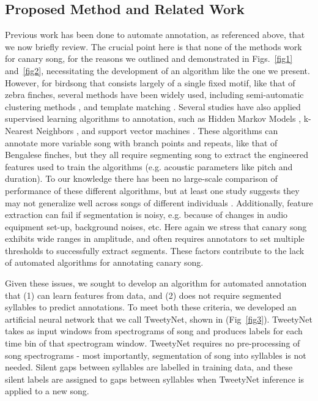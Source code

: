 \documentclass[10pt,letterpaper]{article}
\begin{document}
\subsection*{Proposed Method and Related Work}
\label{Related work}
Previous work has been done to automate annotation, as referenced above, 
that we now briefly review.
The crucial point here is that none of the methods work for canary song, for the 
reasons we outlined and demonstrated in Figs.~\ref{fig1} and~\ref{fig2}, necessitating the 
development of an algorithm like the one we present.
However, for birdsong that consists largely of a single fixed motif, like that of zebra finches,
several methods have been widely used, including semi-automatic clustering methods 
\cite{burkett2015voice,daou2012computational},
and template matching \cite{anderson1996template,yamahachi_undirected_2020,pearre_fast_2017}. 
Several studies have also applied supervised learning algorithms
to annotation, such as Hidden Markov Models \cite{kogan1998automated},
k-Nearest Neighbors \cite{songbrowser}, 
and support vector machines \cite{tachibana2014semi}.
These algorithms can annotate more variable song with branch points and repeats, 
like that of Bengalese finches, 
but they all require segmenting song to extract the engineered features 
used to train the algorithms (e.g. acoustic parameters like pitch and duration).
To our knowledge there has been no large-scale comparison 
of performance of these different algorithms, 
but at least one study suggests they may not generalize well across songs of different 
individuals \cite{nicholson2016comparison}. 
Additionally, feature extraction can fail if segmentation is noisy, 
e.g. because of changes in audio equipment set-up, background noises, etc.
Here again we stress that canary song exhibits wide ranges in amplitude, 
and often requires annotators to set multiple thresholds to successfully extract segments. 
These factors contribute to the lack of automated algorithms for annotating canary song.

Given these issues, we sought to develop an algorithm for automated annotation 
that (1) can learn features from data, and 
(2) does not require segmented syllables to predict annotations.
To meet both these criteria, we developed an artificial neural network 
that we call TweetyNet, shown in (Fig~\ref{fig3}).
TweetyNet takes as input windows from spectrograms of song 
and produces labels for each time bin of that spectrogram window.
TweetyNet requires no pre-processing of song spectrograms - most importantly,  segmentation of song into syllables is not needed. Silent gaps between syllables are labelled in training data, and these silent labels are assigned to gaps between syllables when TweetyNet inference is applied to a new song. 
\end{document}
